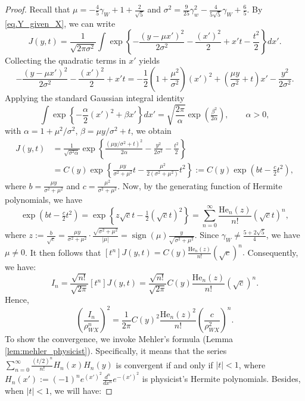 \documentclass[
  12pt]{article}
\begin{document}
\begin{proof}
Recall that $\mu= -\frac{4}{5}\gamma_W+1+\frac{2}{\sqrt{5}}$ and $\sigma^2=\frac{9}{25}\gamma_{w}^{2}-\frac{4}{5\sqrt{5}}\gamma_W+\frac{6}{5}$. By \eqref{eq.Y_given_X}, we can write
$$
J(y,t) = \frac{1}{\sqrt{2\pi \sigma^2}} \int \exp\left\{-\frac{(y-\mu x')^2}{2\sigma^2} - \frac{(x')^2}{2} + x' t - \frac{t^2}{2} \right\} dx'.
$$
Collecting the quadratic terms in $x'$ yields
$$
-\frac{(y-\mu x')^2}{2\sigma^2} - \frac{(x')^2}{2} + x' t
= -\frac{1}{2}\left(1 + \frac{\mu^2}{\sigma^2}\right) (x')^2 + \left(\frac{\mu y}{\sigma^2} + t\right) x' - \frac{y^2}{2\sigma^2}.
$$
Applying the standard Gaussian integral identity
$$
\int \exp\left\{-\frac{\alpha}{2} (x')^2 + \beta x'\right\} dx'
= \sqrt{\frac{2\pi}{\alpha}} \exp\left(\tfrac{\beta^2}{2\alpha}\right),
\qquad \alpha > 0,
$$
with $\alpha = 1 + \mu^2/\sigma^2$, $\beta = \mu y/\sigma^2 + t$, we obtain
\begin{align*}
    J(y,t) &= \frac{1}{\sqrt{\sigma^2 \alpha}} \exp\left\{ \frac{(\mu y/\sigma^2 + t)^2}{2 \alpha} - \frac{y^2}{2\sigma^2} - \frac{t^2}{2} \right\}\\
    &=C(y)\exp\left\{\frac{\mu y}{\sigma^2 + \mu^2} t - \frac{\mu^2}{2(\sigma^2 + \mu^2)} t^2\right\}:=C(y)\exp\left(b t - \frac{c}{2} t^2\right),
\end{align*}
where $b=\frac{\mu y}{\sigma^2 + \mu^2}$ and $c=\frac{\mu^2}{\sigma^2 + \mu^2}$. Now, by the generating function of Hermite polynomials, we have
$$
\exp\left(b t - \tfrac{c}{2} t^2\right)
= \exp\left\{z \sqrt{c} t - \tfrac{1}{2} (\sqrt{c} t)^2\right\}
= \sum_{n=0}^\infty \frac{\mathrm{He}_n(z)}{n!} (\sqrt{c} t)^n,
$$
where
$
z := \frac{b}{\sqrt{c}}
= \frac{\mu y}{\sigma^2 + \mu^2} \cdot \frac{\sqrt{\sigma^2 + \mu^2}}{|\mu|}
= \operatorname{sign}(\mu)  \frac{y}{\sqrt{\sigma^2 + \mu^2}}.
$
Since $\gamma_W \neq \frac{5+2\sqrt{5}}{4}$, we have $\mu \neq 0$. It then follows that
$
[t^n] J(y,t) = C(y) \frac{\mathrm{He}_n(z)}{n!} (\sqrt{c})^n.
$
Consequently, we have:
$$
I_n = \frac{\sqrt{n!}}{\sqrt{2\pi}} [t^n] J(y,t)
= \frac{\sqrt{n!}}{\sqrt{2\pi}} C(y) \frac{\mathrm{He}_n(z)}{n!} (\sqrt{c})^n.
$$
Hence,
$$
\left( \frac{I_n}{\rho_{WX}^n} \right)^2
= \frac{1}{2\pi} C(y)^2 \frac{\mathrm{He}_n(z)^2}{n!} \left(\frac{c}{\rho_{WX}^2}\right)^n.
$$
To show the convergence, we invoke Mehler’s formula (Lemma \ref{lem:mehler_physicist}). Specifically, it means that the series $\sum_{n=0}^{\infty} \frac{(t/2)^n}{n!} H_n(x) H_n(y)$ is convergent if and only if $|t|< 1$, where $H_n(x'):=(-1)^ne^{(x')^2}\frac{d^n}{dx^n}e^{-(x')^2}$ is physicist's Hermite polynomials. Besides, when $|t|< 1$, we will have:

\end{proof}
\end{document}
